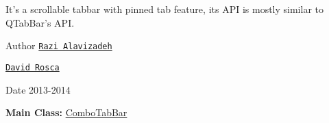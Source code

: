 It's a scrollable tabbar with pinned tab feature, its API is mostly similar to QTabBar's API. \begin{DoxyAuthor}{Author}
\href{https://github.com/srazi}{\tt Razi Alavizadeh} 

\href{https://github.com/nowrep}{\tt David Rosca} 
\end{DoxyAuthor}
\begin{DoxyDate}{Date}
2013-\/2014
\end{DoxyDate}
{\bfseries Main Class:} \hyperlink{class_combo_tab_bar}{ComboTabBar} 